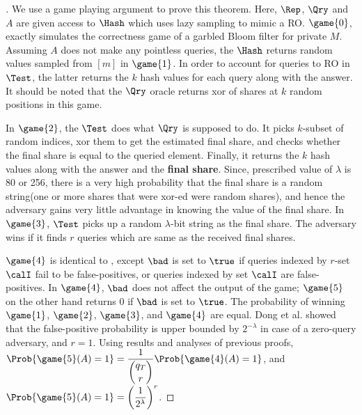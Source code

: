 \begin{proof}[]
We use a game playing argument to prove this theorem. Here, $\Rep$, $\Qry$ and $A$ are given access to $\Hash$ which uses lazy sampling to mimic a RO. $\game{0}$, exactly simulates the correctness game of a garbled Bloom filter for private $M$. Assuming $A$ does not make any pointless queries, the $\Hash$ returns random values sampled from $[m]$ in $\game{1}$. In order to account for queries to RO in $\Test$, the latter returns the $k$ hash values for each query along with the answer. It should be noted that the $\Qry$ oracle returns xor of shares at $k$ random positions in this game. 

In $\game{2}$, the $\Test$ does what $\Qry$ is supposed to do. It picks $k$-subset of random indices, xor them to get the estimated final share, and checks whether the final share is equal to the queried element. Finally, it returns the $k$ hash values along with the answer and the \textbf{final share}. Since, prescribed value of $\lambda$ is 80 or 256, there is a very high probability that the final share is a random string(one or more shares that were xor-ed were random shares), and hence the adversary gains very little advantage in knowing the value of the final share. In $\game{3}$, $\Test$ picks up a random $\lambda$-bit string as the final share. The adversary wins if it finds $r$ queries which are same as the received final shares.

$\game{4}$ is identical to , except $\bad$ is set to $\true$ if queries indexed by $r$-set $\calI$ fail to be false-positives, or queries indexed by set $\calI$ are false-positives. In $\game{4}$, $\bad$ does not affect the output of the game; $\game{5}$ on the other hand returns 0 if $\bad$ is set to $\true$. The probability of winning $\game{1}$, $\game{2}$, $\game{3}$, and $\game{4}$ are equal. Dong et al. \cite{Dong} showed that the false-positive probability is upper bounded by $2^{-\lambda}$ in case of a zero-query adversary, and $r=1$.  Using results and analyses of previous proofs, $\Prob{\game{5}(A)=1} = \dfrac{1}{\dbinom{q_T}{r}}\Prob{\game{4}(A)=1}$, and $\Prob{\game{5}(A) = 1} = \left( \dfrac{1}{2^{\lambda}} \right)^r$.



\end{proof}
